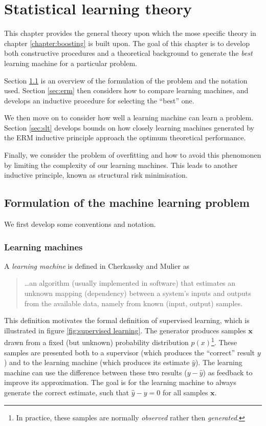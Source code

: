 
\chapter{Statistical learning theory}
\label{chapter:slt}

This chapter provides the general theory upon which the mose specific
theory in chapter \ref{chapter:boosting} is built upon.  The goal of
this chapter is to develop both constructive procedures and a
theoretical background to generate the \emph{best} learning machine
for a particular problem.

Section \ref{sec:formulation} is an overview of the formulation of the
problem and the notation used.  Section \ref{sec:erm} then considers
how to compare learning machines, and develops an inductive procedure
for selecting the ``best'' one.

We then move on to consider how well a learning machine can learn a
problem.  Section \ref{sec:slt} develops bounds on how closely
learning machines generated by the ERM inductive principle approach
the optimum theoretical performance.

Finally, we consider the problem of overfitting and how to avoid this
phenomonen by limiting the complexity of our learning machines.  This
leads to another inductive principle, known as structural risk
minimisation.

\section{Formulation of the machine learning problem}
\label{sec:formulation}

We first develop some conventions and notation.

\subsection{Learning machines}
\label{sec:learning machines}
A \emph{learning machine} is defined in Cherkassky and Mulier
\cite{Cherkassky98} as 
%
\begin{quote}
	\ldots an algorithm (usually implemented in software) that
	estimates an unknown mapping (dependency) between a system's
	inputs and outputs from the available data, namely from known
	(input, output) samples.
\end{quote}
%
This definition motivates the formal definition of supervised learning,
which is illustrated in figure \ref{fig:supervised learning}.  The generator
produces samples $\mathbf{x}$ drawn from a fixed (but unknown)
probability distribution $p(x)$\footnote{In practice, these samples
are normally \emph{observed} rather then \emph{generated}.}.
These samples are presented both to
a supervisor (which produces the ``correct'' result $y$) and to the
learning machine (which produces its estimate $\hat{y}$).  The
learning machine can use the difference between these two results
($y - \hat{y}$) as feedback to improve its approximation.  The goal
is for the learning machine to always generate the correct
estimate, such that $\hat{y} - y = 0$ for all samples $\mathbf{x}$.

